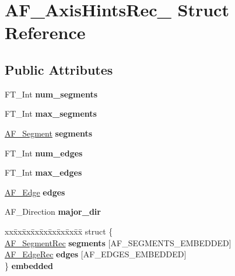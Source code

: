 \hypertarget{struct_a_f___axis_hints_rec__}{}\section{A\+F\+\_\+\+Axis\+Hints\+Rec\+\_\+ Struct Reference}
\label{struct_a_f___axis_hints_rec__}
\subsection*{Public Attributes}
\begin{DoxyCompactItemize}
\item 
\mbox{\label{struct_a_f___axis_hints_rec___a59363b5d4f01b2596971cda9bcc6ba1f}} 
F\+T\+\_\+\+Int {\bfseries num\+\_\+segments}
\item 
\mbox{\label{struct_a_f___axis_hints_rec___a65ce15904dade6d635f667226cba26ae}} 
F\+T\+\_\+\+Int {\bfseries max\+\_\+segments}
\item 
\mbox{\label{struct_a_f___axis_hints_rec___a0af027de055b8d646d0c1c7468c4cb52}} 
\hyperlink{struct_a_f___segment_rec__}{A\+F\+\_\+\+Segment} {\bfseries segments}
\item 
\mbox{\label{struct_a_f___axis_hints_rec___a3313ee61ecfaac9625f5925c79b0a9bb}} 
F\+T\+\_\+\+Int {\bfseries num\+\_\+edges}
\item 
\mbox{\label{struct_a_f___axis_hints_rec___a954d98eda01636812284d10afeecb1c2}} 
F\+T\+\_\+\+Int {\bfseries max\+\_\+edges}
\item 
\mbox{\label{struct_a_f___axis_hints_rec___a4c2d0f3a7406e87957d4a8cbdb9f5d44}} 
\hyperlink{struct_a_f___edge_rec__}{A\+F\+\_\+\+Edge} {\bfseries edges}
\item 
\mbox{\label{struct_a_f___axis_hints_rec___a57536b4d9796707b7580ec00cd34453e}} 
A\+F\+\_\+\+Direction {\bfseries major\+\_\+dir}
\item 
\mbox{\label{struct_a_f___axis_hints_rec___a404d517cd93f8410f1e64a3ee5f7d92d}} 
\begin{tabbing}
xx\=xx\=xx\=xx\=xx\=xx\=xx\=xx\=xx\=\kill
struct \{\\
\>\hyperlink{struct_a_f___segment_rec__}{AF\_SegmentRec} {\bfseries segments} \mbox{[}AF\_SEGMENTS\_EMBEDDED\mbox{]}\\
\>\hyperlink{struct_a_f___edge_rec__}{AF\_EdgeRec} {\bfseries edges} \mbox{[}AF\_EDGES\_EMBEDDED\mbox{]}\\
\} {\bfseries embedded}\\

\end{tabbing}\end{DoxyCompactItemize}


